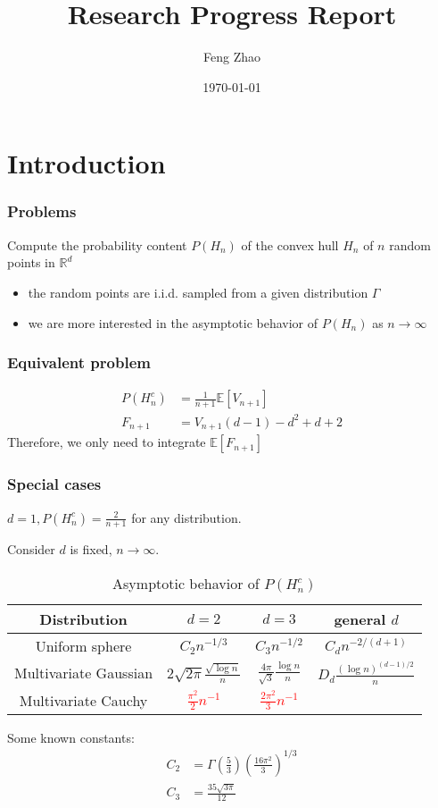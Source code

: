 \documentclass{beamer}
\title{Research Progress Report}
\author{Feng Zhao}
\date{\today}
\begin{document}
\begin{frame}
	\titlepage
\end{frame}


\section{Introduction}

\begin{frame}
\frametitle{Problems}
Compute the probability content $P(H_n)$ of the convex hull $H_n$
of $n$ random points in $\mathbb{R}^d$
\begin{itemize}
\item the random points are i.i.d. sampled from a given distribution $\Gamma$
\item we are more interested in the asymptotic behavior of $P(H_n)$
as $n\to\infty$
\end{itemize}
\end{frame}
\begin{frame}
	\frametitle{Equivalent problem}
    \begin{align}
        P(H_n^c) & = \frac{1}{n+1}\mathbb{E}[V_{n+1}]\\
        F_{n+1} & = V_{n+1} (d-1) - d^2 + d + 2
    \end{align}   
    Therefore, we only need to integrate
    $\mathbb{E}[F_{n+1}]$
\end{frame}   
\begin{frame}
    \frametitle{Special cases}
    $d=1,P(H_n^c) = \frac{2}{n+1}$ for any distribution.
    
    Consider $d$ is fixed, $n\to \infty$.
    \begin{table}
        \begin{tabular}{|c|c|c|c|}
            \hline
            Distribution & $d=2$ & $d=3$ &  general $d$ \\
            \hline
            Uniform sphere & $C_2 n^{-1/3}$ & $C_3 n^{-1/2}$ &
            $C_{d} n^{-2/(d+1)}$ \\
            \hline
            Multivariate Gaussian &
            $2\sqrt{2\pi}\frac{\sqrt{\log n}}{n}$
            & $\frac{4\pi}{\sqrt{3}}\frac{\log n}{n}$ & $D_d\frac{(\log n)^{(d-1)/2}}{n}$ \\
            \hline
            Multivariate Cauchy & 
            \textcolor{red}{$\frac{\pi^2}{2}n^{-1}$} &
            \textcolor{red}{$\frac{2\pi^2}{3}n^{-1}$} &\\
            \hline
        \end{tabular}
        \caption{Asymptotic behavior of $P(H_n^c)$}
    \end{table}
    Some known constants:
    \begin{align*}
    C_2 &= \Gamma\left(\frac{5}{3}\right) \left(\frac{16\pi^2}{3}
    \right)^{1/3} \\
    C_3 &= \frac{35\sqrt{3\pi}}{12}
    \end{align*}
\end{frame}
\end{document}

